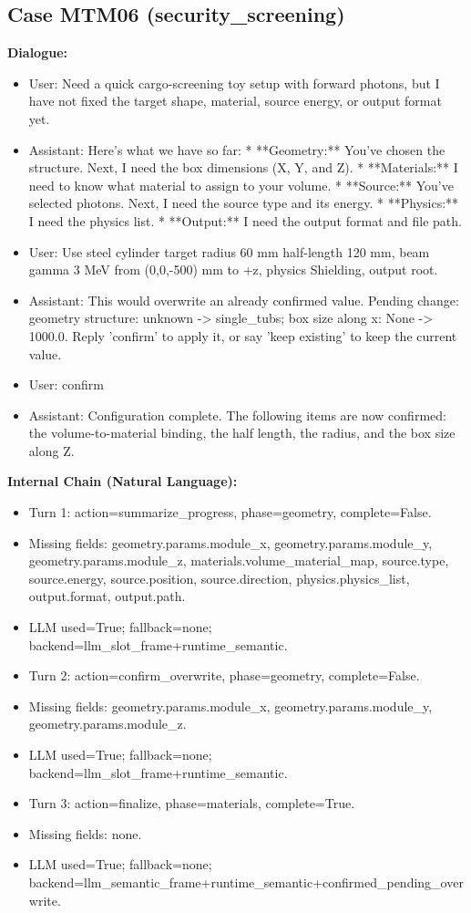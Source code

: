 \documentclass[11pt]{ctexart}
\begin{document}
\subsection{Case MTM06 (security\_screening)}
\textbf{Dialogue:}
\begin{itemize}
\item User: Need a quick cargo-screening toy setup with forward photons, but I have not fixed the target shape, material, source energy, or output format yet.
\item Assistant: Here's what we have so far:
*   **Geometry:** You've chosen the structure. Next, I need the box dimensions (X, Y, and Z).
*   **Materials:** I need to know what material to assign to your volume.
*   **Source:** You've selected photons. Next, I need the source type and its energy.
*   **Physics:** I need the physics list.
*   **Output:** I need the output format and file path.
\item User: Use steel cylinder target radius 60 mm half-length 120 mm, beam gamma 3 MeV from (0,0,-500) mm to +z, physics Shielding, output root.
\item Assistant: This would overwrite an already confirmed value. Pending change: geometry structure: unknown -> single\_tubs; box size along x: None -> 1000.0. Reply 'confirm' to apply it, or say 'keep existing' to keep the current value.
\item User: confirm
\item Assistant: Configuration complete. The following items are now confirmed: the volume-to-material binding, the half length, the radius, and the box size along Z.
\end{itemize}
\textbf{Internal Chain (Natural Language):}
\begin{itemize}
\item Turn 1: action=summarize\_progress, phase=geometry, complete=False.
\item Missing fields: geometry.params.module\_x, geometry.params.module\_y, geometry.params.module\_z, materials.volume\_material\_map, source.type, source.energy, source.position, source.direction, physics.physics\_list, output.format, output.path.
\item LLM used=True; fallback=none; backend=llm\_slot\_frame+runtime\_semantic.
\item Turn 2: action=confirm\_overwrite, phase=geometry, complete=False.
\item Missing fields: geometry.params.module\_x, geometry.params.module\_y, geometry.params.module\_z.
\item LLM used=True; fallback=none; backend=llm\_slot\_frame+runtime\_semantic.
\item Turn 3: action=finalize, phase=materials, complete=True.
\item Missing fields: none.
\item LLM used=True; fallback=none; backend=llm\_semantic\_frame+runtime\_semantic+confirmed\_pending\_overwrite.
\end{itemize}
\end{document}

